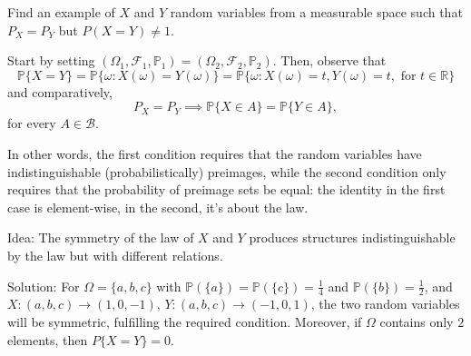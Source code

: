 	\begin{my_ex}
	Find an example of $X$ and $Y$ random variables from a measurable space such that $P_X = P_Y$ but $P(X=Y) \neq 1$.
	\end{my_ex}
	\begin{my_remark}
	Start by setting $(\Omega_1,\mathcal{F}_1,\mathbb{P}_1)=(\Omega_2,\mathcal{F}_2,\mathbb{P}_2)$. Then, observe that
	\[
		\mathbb{P} \{ X = Y \} = \mathbb{P} \{ \omega : X( \omega ) =Y( \omega ) \} = \mathbb{P} \{ \omega : X( \omega ) = t, Y( \omega ) = t, \text{ for } t \in \mathbb{R} \}
	\]
	and comparatively,
	\[
		P_X = P_Y \implies \mathbb{P} \{ X \in A \} = \mathbb{P} \{ Y \in A \},
	\]
	for every $A \in \mathcal{B}$.
	
	In other words, the first condition requires that the random variables have indistinguishable (probabilistically) preimages, while the second condition only requires that the probability of preimage sets be equal: the identity in the first case is element-wise, in the second, it's about the law.
	
	Idea: The symmetry of the law of $X$ and $Y$ produces structures indistinguishable by the law but with different relations.
	
	Solution: For $\Omega = \{a,b,c\}$ with $\mathbb{P}(\{a\})=\mathbb{P}(\{c\})=\frac{1}{4}$ and $\mathbb{P}(\{b\})=\frac{1}{2}$, and $X: (a,b,c)\to(1,0,-1)$, $Y: (a,b,c)\to(-1,0,1)$, the two random variables will be symmetric, fulfilling the required condition. Moreover, if $\Omega$ contains only $2$ elements, then $P\{X=Y\}=0$.
\end{my_remark}
	
